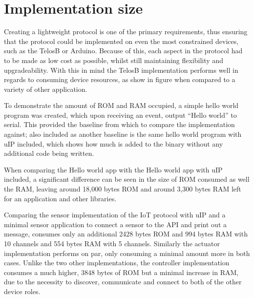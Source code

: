 
\section{Implementation size} %
\label{sec:implementation_size_and_performance}
Creating a lightweight protocol is one of the primary requirements, thus ensuring that the protocol could be implemented on even the most constrained devices, such as the TelosB or Arduino. Because of this, each aspect in the protocol had to be made as low cost as possible, whilst still maintaining flexibility and upgradeability. With this in mind the TelosB implementation performs well in regards to consuming device resources, as show in figure \cite{size} when compared to a variety of other application.

To demonstrate the amount of ROM and RAM occupied, a simple hello world program was created, which upon receiving an event, output ``Hello world'' to serial. This provided the baseline from which to compare the implementation against; also included as another baseline is the same hello world program with uIP included, which shows how much is added to the binary without any additional code being written.

When comparing the Hello world app with the Hello world app with uIP included, a significant difference can be seen in the size of ROM consumed as well the RAM, leaving around 18,000 bytes ROM and around 3,300 bytes RAM left for an application and other libraries.

Comparing the sensor implementation of the IoT protocol with uIP and a minimal sensor application to connect a sensor to the API and print out a message, consumes only an additional 2428 bytes ROM and 994 bytes RAM with 10 channels and 554 bytes RAM with 5 channels.
Similarly the actuator implementation performs on par, only consuming a minimal amount more in both cases. Unlike the two other implementations, the controller implementation consumes a much higher, 3848 bytes of ROM but a minimal increase in RAM, due to the necessity to discover, communicate and connect to both of the other device roles.

